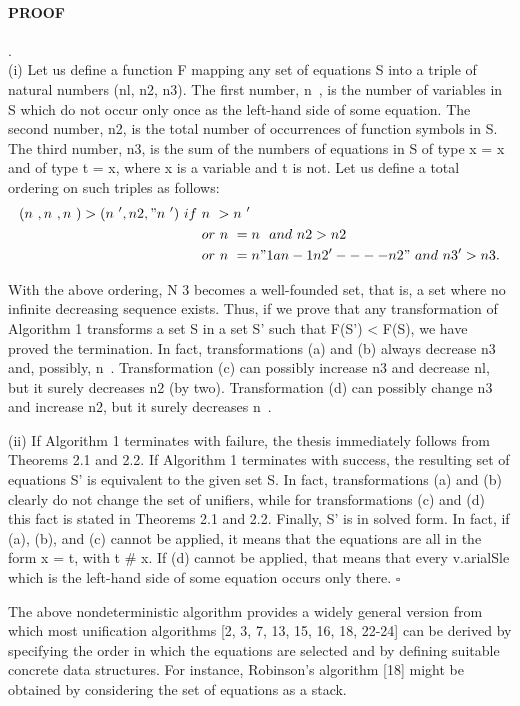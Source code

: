 \paragraph{PROOF}.\\

(i) Let us define a function F mapping any set of equations S into a triple of
natural numbers (nl, n2, n3). The first number, n~, is the number of variables in
S which do not occur only once as the left-hand side of some equation. The
second number, n2, is the total number of occurrences of function symbols in S.
The third number, n3, is the sum of the numbers of equations in S of type x = x
and of type t = x, where x is a variable and t is not. Let us define a total ordering
on such triples as follows:
\begin{align*}
(n~, n~, n~) > (n~', n2, " n~')\ if\ &n~ > n~'\\
&or\ n~ = n~\ and\ n2 > n2\\
&or\ n~=n" 1 a n- 1 n2 ' ---- n2 "\ and\ n3 ' > n3.\\ 
\end{align*}   

With the above ordering, N 3 becomes a well-founded set, that is, a set where no
infinite decreasing sequence exists. Thus, if we prove that any transformation of
Algorithm 1 transforms a set S in a set S' such that F(S') < F(S), we have
proved the termination. In fact, transformations (a) and (b) always decrease n3
and, possibly, n~. Transformation (c) can possibly increase n3 and decrease nl,
but it surely decreases n2 (by two). Transformation (d) can possibly change n3
and increase n2, but it surely decreases n~. 

(ii) If Algorithm 1 terminates with failure, the thesis immediately follows from
Theorems 2.1 and 2.2. If Algorithm 1 terminates with success, the resulting set of
equations S' is equivalent to the given set S. In fact, transformations (a) and (b)
clearly do not change the set of unifiers, while for transformations (c) and (d) this
fact is stated in Theorems 2.1 and 2.2. Finally, S' is in solved form. In fact, if (a),
(b), and (c) cannot be applied, it means that the equations are all in the form
x = t, with t \# x. If (d) cannot be applied, that means that every v.arialSle
which is the left-hand side of some equation occurs only there.
$\square$\bigskip

The above nondeterministic algorithm provides a widely general version from
which most unification algorithms [2, 3, 7, 13, 15, 16, 18, 22-24] can be derived by
specifying the order in which the equations are selected and by defining suitable
concrete data structures. For instance, Robinson's algorithm [18] might be
obtained by considering the set of equations as a stack. 

